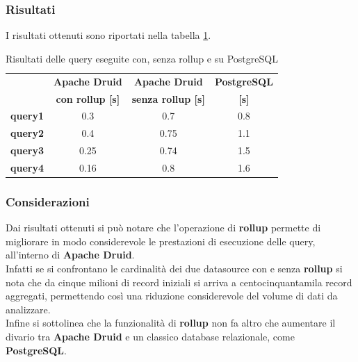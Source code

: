 \subsubsection{Risultati}
I risultati ottenuti sono riportati nella tabella \ref{tab:risultati_rollup}.
\begin{table}[h]
  \centering
  \caption{Risultati delle query eseguite con, senza rollup e su PostgreSQL}
  \label{tab:risultati_rollup}
  \begin{tabular}{|c|c|c|c|}
  \hline
 & \textbf{Apache Druid}  & \textbf{Apache Druid} & \textbf{PostgreSQL}  \\
& \textbf{ con rollup [s]} & \textbf{ senza rollup [s]}  & \textbf{ [s]} \\\hline
  \textbf{query1} &   0.3  &  0.7 &  0.8 \\ \hline
  \textbf{query2} &  0.4 &  0.75 &  1.1 \\ \hline
  \textbf{query3} &   0.25   &  0.74  &  1.5 \\ \hline
  \textbf{query4} &   0.16   &  0.8  &  1.6 \\ \hline
  \end{tabular}
\end{table}
\subsubsection{Considerazioni}
Dai risultati ottenuti si può notare che l'operazione di \textbf{rollup} 
permette di migliorare in modo considerevole le prestazioni di esecuzione delle query, all'interno di \textbf{Apache Druid}.\\
Infatti se si confrontano le cardinalità dei due \gls{datasource}{} con e senza \textbf{rollup} si nota che da cinque milioni di record iniziali
si arriva a centocinquantamila record aggregati, permettendo così una riduzione considerevole del volume di dati da analizzare.\\
Infine si sottolinea che la funzionalità di \textbf{rollup} non fa altro che aumentare il divario tra \textbf{Apache Druid} e un 
classico database relazionale, come \textbf{PostgreSQL}.
\pagebreak
